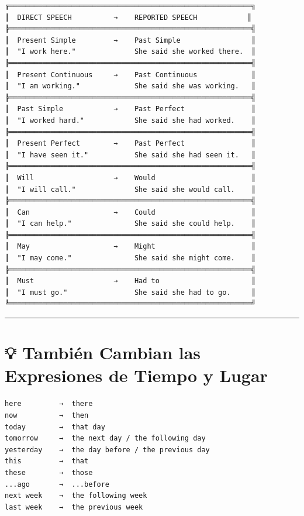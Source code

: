 \documentclass[
  spanish,
  letterpaper,
]{scrbook}
\begin{document}
\begin{verbatim}
╔══════════════════════════════════════════════════════════╗
║  DIRECT SPEECH          →    REPORTED SPEECH            ║
╠══════════════════════════════════════════════════════════╣
║  Present Simple         →    Past Simple                 ║
║  "I work here."              She said she worked there.  ║
╠══════════════════════════════════════════════════════════╣
║  Present Continuous     →    Past Continuous             ║
║  "I am working."             She said she was working.   ║
╠══════════════════════════════════════════════════════════╣
║  Past Simple            →    Past Perfect                ║
║  "I worked hard."            She said she had worked.    ║
╠══════════════════════════════════════════════════════════╣
║  Present Perfect        →    Past Perfect                ║
║  "I have seen it."           She said she had seen it.   ║
╠══════════════════════════════════════════════════════════╣
║  Will                   →    Would                       ║
║  "I will call."              She said she would call.    ║
╠══════════════════════════════════════════════════════════╣
║  Can                    →    Could                       ║
║  "I can help."               She said she could help.    ║
╠══════════════════════════════════════════════════════════╣
║  May                    →    Might                       ║
║  "I may come."               She said she might come.    ║
╠══════════════════════════════════════════════════════════╣
║  Must                   →    Had to                      ║
║  "I must go."                She said she had to go.     ║
╚══════════════════════════════════════════════════════════╝
\end{verbatim}

\begin{center}\rule{0.5\linewidth}{0.5pt}\end{center}

\section{💡 También Cambian las Expresiones de Tiempo y
Lugar}\label{tambiuxe9n-cambian-las-expresiones-de-tiempo-y-lugar}

\begin{verbatim}
here         →  there
now          →  then
today        →  that day
tomorrow     →  the next day / the following day
yesterday    →  the day before / the previous day
this         →  that
these        →  those
...ago       →  ...before
next week    →  the following week
last week    →  the previous week
\end{verbatim}
\end{document}
